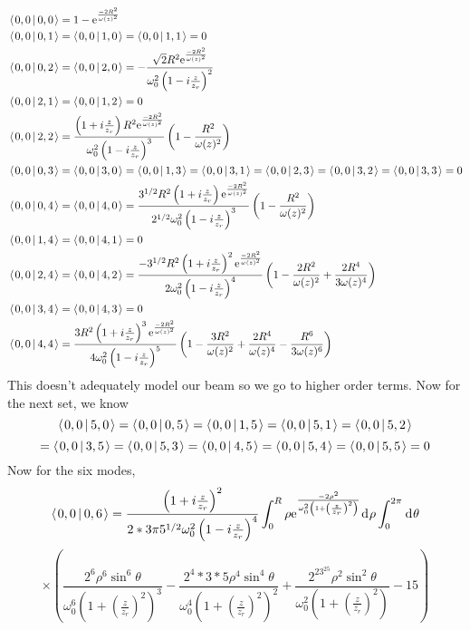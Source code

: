 \documentclass[11pt]{amsart}
\makeatletter
\newcommand{\e}{{\rm e}}				%
\newcommand{\msp}[1]{\mspace{#1mu}}		%
\newcommand{\0}{\varnothing}		%
\newcommand{\dd}{\msp{1} {\rm{d}} \msp{1}}	%
\newcommand{\brac}[2]{\left\langle\msp{2} #1\left\lvert \msp{3.5} #2 \right.\right\rangle}	%
\newcommand{\1}{!}
\newcommand{\2}{@}
\newcommand{\3}{\#}
\newcommand{\4}{\$}
\newcommand{\5}{\%}
\newcommand{\6}{$^\wedge$}
\newcommand{\7}{\&}
\newcommand{\8}{*}
\newcommand{\9}{(}
\makeatother
\begin{document}
\begin{align*}
&\brac{0,0}{0,0} = 1-\e^{\frac{-2R^2}{\omega(z)^2}}
\\
&\brac{0,0}{0,1} = \brac{0,0}{1,0} = \brac{0,0}{1,1} = 0
\\
&\brac{0,0}{0,2} = \brac{0,0}{2,0} = -\frac{\sqrt{2}R^2\e^{\frac{-2R^2}{\omega(z)^2}}}{\omega_0^2\left(1-i\frac{z}{z_r}\right)^2}
\\
&\brac{0,0}{2,1} = \brac{0,0}{1,2} = 0
\\
&\brac{0,0}{2,2} = \frac{\left(1+i\frac{z}{z_r}\right)R^2\e^{\frac{-2R^2}{\omega(z)^2}}}{\omega_0^2\left(1-i\frac{z}{z_r}\right)^3}\left(1-\frac{R^2}{\omega(z)^2}\right)
\\
&\brac{0,0}{0,3} = \brac{0,0}{3,0} = \brac{0,0}{1,3} = \brac{0,0}{3,1} = \brac{0,0}{2,3} = \brac{0,0}{3,2} = \brac{0,0}{3,3} = 0
\\
&\brac{0,0}{0,4} = \brac{0,0}{4,0} = \frac{3^{1/2}R^2\left(1+i\frac{z}{z_r}\right)\e^{\frac{-2R^2}{\omega(z)^2}}}{2^{1/2}\omega_0^2\left(1-i\frac{z}{z_r}\right)^3}\left(1-\frac{R^2}{\omega(z)^2}\right)
\\
&\brac{0,0}{1,4} = \brac{0,0}{4,1} = 0
\\
&\brac{0,0}{2,4} = \brac{0,0}{4,2} = \frac{-3^{1/2}R^2\left(1+i\frac{z}{z_r}\right)^2\e^{\frac{-2R^2}{\omega(z)^2}}}{2\omega_0^2\left(1-i\frac{z}{z_r}\right)^4}\left(1-\frac{2R^2}{\omega(z)^2}+\frac{2R^4}{3\omega(z)^4}\right)
\\
&\brac{0,0}{3,4} = \brac{0,0}{4,3} = 0
\\
&
\brac{0,0}{4,4} = \frac{3R^2\left(1+i\frac{z}{z_r}\right)^3\e^{\frac{-2R^2}{\omega(z)^2}}}{4\omega_0^2\left(1-i\frac{z}{z_r}\right)^5}\left(1-\frac{3R^2}{\omega(z)^2}+\frac{2R^4}{\omega(z)^4}-\frac{R^6}{3\omega(z)^6}\right)
\end{align*}
\newpage
This doesn't adequately model our beam so we go to higher order terms. Now for the next set, we know
\[
\brac{0,0}{5,0}=\brac{0,0}{0,5} = \brac{0,0}{1,5} = \brac{0,0}{5,1}=\brac{0,0}{5,2}
\]
\[
= \brac{0,0}{3,5} = \brac{0,0}{5,3} = \brac{0,0}{4,5} = \brac{0,0}{5,4} = \brac{0,0}{5,5} = 0
\]
Now for the six modes,
\[
\brac{0,0}{0,6} = \frac{\left(1+i\frac{z}{z_r}\right)^2}{2*3\pi5^{1/2}\omega_0^2\left(1-i\frac{z}{z_r}\right)^4}\int_0^R\rho\e^{\frac{-2\rho^2}{\omega_0^2\left(1+\left(\frac{z}{z_r}\right)^2\right)}}\dd \rho\int_0^{2\pi}\dd \theta 
\]
\[
\times\left(\frac{2^6\rho^6\sin^6 \theta}{\omega_0^6\left(1+\left(\frac{z}{z_r}\right)^2\right)^3}-\frac{2^4*3*5\rho^4\sin^4\theta}{\omega_0^4\left(1+\left(\frac{z}{z_r}\right)^2\right)^2}+\frac{2^23^25\rho^2\sin^2\theta}{\omega_0^2\left(1+\left(\frac{z}{z_r}\right)^2\right)}-15\right)
\]
\end{document}
